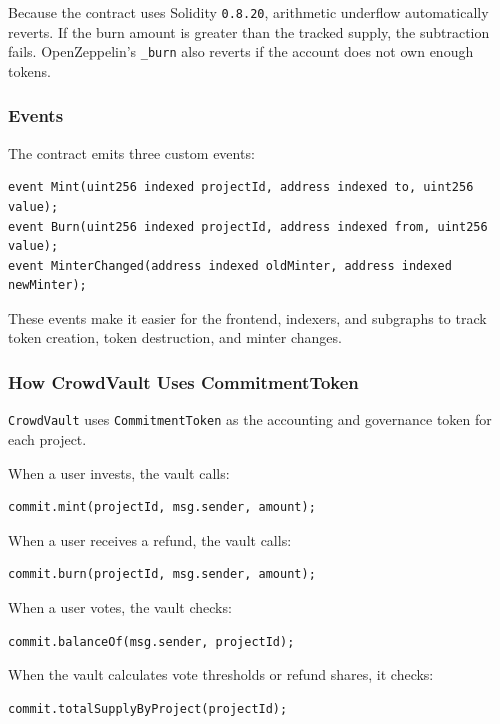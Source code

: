 \documentclass[11pt,a4paper]{article}
\begin{document}
Because the contract uses Solidity \texttt{0.8.20}, arithmetic underflow automatically reverts. If the burn amount is greater than the tracked supply, the subtraction fails. OpenZeppelin's \texttt{\_burn} also reverts if the account does not own enough tokens.

\subsubsection{Events}

The contract emits three custom events:

\begin{lstlisting}
event Mint(uint256 indexed projectId, address indexed to, uint256 value);
event Burn(uint256 indexed projectId, address indexed from, uint256 value);
event MinterChanged(address indexed oldMinter, address indexed newMinter);
\end{lstlisting}

These events make it easier for the frontend, indexers, and subgraphs to track token creation, token destruction, and minter changes.

\subsubsection{How CrowdVault Uses CommitmentToken}

\texttt{CrowdVault} uses \texttt{CommitmentToken} as the accounting and governance token for each project.

When a user invests, the vault calls:

\begin{lstlisting}
commit.mint(projectId, msg.sender, amount);
\end{lstlisting}

When a user receives a refund, the vault calls:

\begin{lstlisting}
commit.burn(projectId, msg.sender, amount);
\end{lstlisting}

When a user votes, the vault checks:

\begin{lstlisting}
commit.balanceOf(msg.sender, projectId);
\end{lstlisting}

When the vault calculates vote thresholds or refund shares, it checks:

\begin{lstlisting}
commit.totalSupplyByProject(projectId);
\end{lstlisting}
\end{document}

